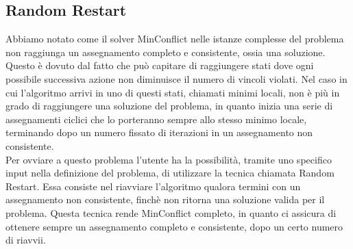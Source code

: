 \subsection{Random Restart}
Abbiamo notato come il solver MinConflict nelle istanze complesse del problema non raggiunga un assegnamento completo e consistente, ossia una soluzione. Questo è dovuto dal fatto che può capitare di raggiungere stati dove ogni possibile successiva azione non diminuisce il numero di vincoli violati. Nel caso in cui l'algoritmo arrivi in uno di questi stati, chiamati minimi locali, non è più in grado di raggiungere una soluzione del problema, in quanto inizia una serie di assegnamenti ciclici che lo porteranno sempre allo stesso minimo locale, terminando dopo un numero fissato di iterazioni in un assegnamento non consistente.\\
Per ovviare a questo problema l'utente ha la possibilità, tramite uno specifico input nella definizione del problema, di utilizzare la tecnica chiamata Random Restart. Essa consiste nel riavviare l'algoritmo qualora termini con un assegnamento non consistente, finchè non ritorna una soluzione valida per il problema. Questa tecnica rende MinConflict completo, in quanto ci assicura di ottenere sempre un assegnamento completo e consistente, dopo un certo numero di riavvii.\\



 